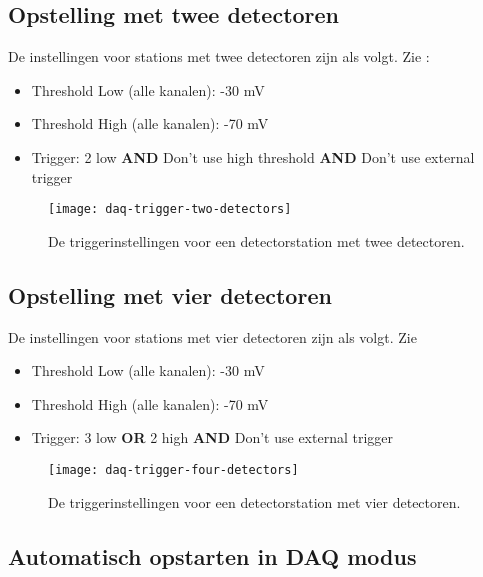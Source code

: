 \subsection{Opstelling met twee detectoren}

De instellingen voor stations met twee detectoren zijn als volgt. Zie
:


\begin{itemize}
    \item Threshold Low (alle kanalen): -30 mV
    \item Threshold High (alle kanalen): -70 mV
    \item Trigger: 2 low \textbf{AND} Don’t use high threshold \textbf{AND} Don’t use external trigger
\end{itemize}


\begin{figure}
    \centering
    \texttt{[image: daq-trigger-two-detectors]}
    \caption{De triggerinstellingen voor een detectorstation met twee detectoren.}
    \label{fig:daq-trigger-two-detectors}
\end{figure}


\subsection{Opstelling met vier detectoren}

De instellingen voor stations met vier detectoren zijn als volgt. Zie

\begin{itemize}
    \item Threshold Low (alle kanalen): -30 mV
    \item Threshold High (alle kanalen): -70 mV
    \item Trigger: 3 low \textbf{OR} 2 high \textbf{AND} Don’t use external trigger
\end{itemize}   

 
\begin{figure}
    \centering
    \texttt{[image: daq-trigger-four-detectors]}
    \caption{De triggerinstellingen voor een detectorstation met vier detectoren.}
    \label{fig:daq-trigger-four-detectors}
\end{figure}

\subsection{Automatisch opstarten in DAQ modus}

